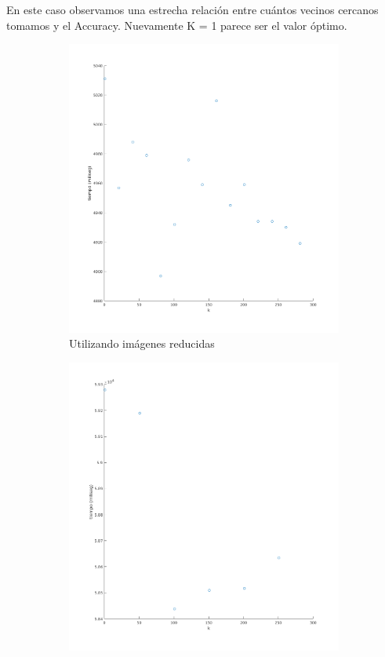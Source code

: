 En este caso observamos una estrecha relación entre cuántos vecinos cercanos tomamos y el Accuracy.
Nuevamente K = 1 parece ser el valor óptimo.


\begin{figure}[H]
\begin{subfigure}[h]{0.62\linewidth}
\includegraphics[width=\linewidth]{img/k_pca_tiempo.png}
\caption{Utilizando imágenes reducidas}
\end{subfigure}
\hfill
\begin{subfigure}[h]{0.62\linewidth}
\includegraphics[width=\linewidth]{img/big_k_pca_tiempo.png}

\end{subfigure}
\end{figure}
